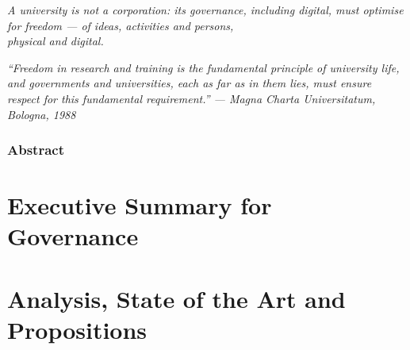 \documentclass[11pt,a4paper,twoside]{book}
\newcommand{\genericroot}{../../..}
\newcommand{\policysrc}{\genericroot/suit-policy}%
\let\oldsection\section
\begin{document}
\begin{titlepage}
\begin{tcolorbox}[colback=BrickRed!8!white,colframe=BrickRed!75!black,boxrule=1.2pt,
    arc=3pt,left=12pt,right=12pt,top=8pt,bottom=8pt,width=0.88\textwidth,halign=center]
{\normalsize\itshape A university is not a corporation: its governance, including digital,
must optimise for freedom --- of ideas, activities and persons,\\physical and digital.}
\end{tcolorbox}
\vspace{0.4cm}
\begin{minipage}{0.85\textwidth}
\centering\small\itshape
``Freedom in research and training is the fundamental principle of university life, and governments and universities, each as far as in them lies, must ensure respect for this fundamental requirement.''
\upshape\smallskip
--- \textit{Magna Charta Universitatum}, Bologna, 1988~\cite{magna-charta}
\end{minipage}
\vspace{2cm}
\end{titlepage}

\frontmatter
\hypersetup{pageanchor=true}

\section*{Abstract}

\newpage

\tableofcontents

\mainmatter

\part{Executive Summary for Governance}\label{part:companion}
\setcounter{secnumdepth}{0}
\renewcommand{\section}{\oldsection}
\glsresetall


\part{Analysis, State of the Art and Propositions}\label{part:main}
\setcounter{secnumdepth}{3}
\setcounter{section}{0}
\renewcommand{\section}{\clearpage\oldsection}
\glsresetall

\end{document}
